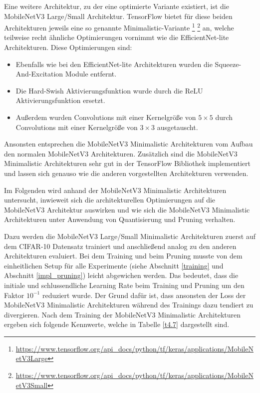 Eine weitere Architektur, zu der eine optimierte Variante existiert, ist die MobileNetV3 Large/Small Architektur. TensorFlow bietet für diese beiden Architekturen jeweils eine so genannte Minimalistic-Variante \footnote{\url{https://www.tensorflow.org/api_docs/python/tf/keras/applications/MobileNetV3Large}} \footnote{\url{https://www.tensorflow.org/api_docs/python/tf/keras/applications/MobileNetV3Small}} an, welche teilweise recht ähnliche Optimierungen vornimmt wie die EfficientNet-lite Architekturen. Diese Optimierungen sind:
\begin{itemize}
\item Ebenfalls wie bei den EfficientNet-lite Architekturen wurden die Squeeze-And-Excitation Module entfernt.
\item Die Hard-Swish Aktivierungsfunktion wurde durch die ReLU Aktivierungsfunktion ersetzt.
\item Außerdem wurden Convolutions mit einer Kernelgröße von $5 \times 5$ durch Convolutions mit einer Kernelgröße von $3 \times 3$ ausgetauscht.
\end{itemize}
Ansonsten entsprechen die MobileNetV3 Minimalistic Architekturen vom Aufbau den normalen MobileNetV3 Architekturen. Zusätzlich sind die MobileNetV3 Minimalistic Architekturen sehr gut in der TensorFlow Bibliothek implementiert und lassen sich genauso wie die anderen vorgestellten Architekturen verwenden.

Im Folgenden wird anhand der MobileNetV3 Minimalistic Architekturen untersucht, inwieweit sich die architekturellen Optimierungen auf die MobileNetV3 Architektur auswirken und wie sich die MobileNetV3 Minimalistic Architekturen unter Anwendung von Quantisierung und Pruning verhalten.

Dazu werden die MobileNetV3 Large/Small Minimalistic Architekturen zuerst auf dem CIFAR-10 Datensatz trainiert und anschließend analog zu den anderen Architekturen evaluiert. Bei dem Training und beim Pruning musste von dem einheitlichen Setup für alle Experimente (siehe Abschnitt \ref{training} und Abschnitt \ref{impl_pruning}) leicht abgewichen werden. Das bedeutet, dass die initiale und schlussendliche Learning Rate beim Training und Pruning um den Faktor $10^{-1}$ reduziert wurde. Der Grund dafür ist, dass ansonsten der Loss der MobileNetV3 Minimalistic Architekturen während des Trainings dazu tendiert zu divergieren. Nach dem Training der MobileNetV3 Minimalistic Architekturen ergeben sich folgende Kennwerte, welche in Tabelle \ref{t4.7} dargestellt sind.

